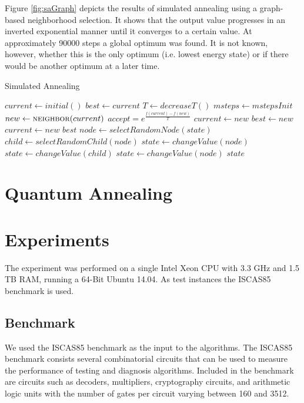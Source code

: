 \documentclass{article}
\begin{document}
Figure \ref{fig:saGraph} depicts the results of simulated annealing
using a graph-based neighborhood selection. It shows that the output
value progresses in an inverted exponential manner until it converges
to a certain value. At approximately 90000 steps a global optimum was
found. It is not known, however, whether this is the only optimum
(i.e. lowest energy state) or if there would be another optimum at a
later time.


\begin{algorithm}[htb]
	\caption{Simulated Annealing}\label{alg:sa}
	\begin{algorithmic}
		\State $current \gets initial()$
		\State $best \gets current$
		\State $T \gets decreaseT()$
		\State $msteps \gets mstepsInit$
		\EndIf
		\State $new \gets \textsc{neighbor}(current)$
		\State $accept = e^{\frac{f(current)-f(new)}{T}}$
		\State $current \gets new$
		\State $best \gets new$
		\EndIf
		\State $current \gets new$
		\EndIf		
		\EndWhile
		\State \Return $best$
		\EndFunction
		\State $node \gets selectRandomNode(state)$
		\State $child \gets selectRandomChild(node)$
		\State $state \gets changeValue(node)$
		\State $state \gets changeValue(child)$
		\EndIf
		\State $state \gets changeValue(node)$
		\State \Return $state$
		\EndFunction
	\end{algorithmic}
\end{algorithm}
\section{Quantum Annealing}
\section{Experiments}
%
The experiment was performed on a single Intel Xeon CPU with 3.3 GHz
and 1.5 TB RAM, running a 64-Bit Ubuntu 14.04. As test instances the
ISCAS85 benchmark is used.

\subsection{Benchmark}
We used the ISCAS85 benchmark \cite{iscas} as the input to the
algorithms. The ISCAS85 benchmark consists several combinatorial
circuits that can be used to measure the performance of testing and
diagnosis algorithms. Included in the benchmark are circuits such as
decoders, multipliers, cryptography circuits, and arithmetic logic
units with the number of gates per circuit varying between 160 and
3512.
\end{document}
